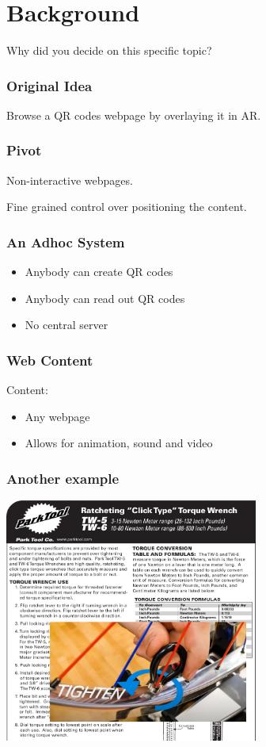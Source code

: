 \documentclass{beamer}
\begin{document}
\section{Background}
\begin{frame}
	\begin{center}
		{\Huge Why did you decide on this specific topic?}
	\end{center}
\end{frame}

\begin{frame}
  \frametitle{Original Idea}

  Browse a QR codes webpage by overlaying it in AR.
\end{frame}

\begin{frame}
  \frametitle{Pivot}

  Non-interactive webpages.

  \medskip

  Fine grained control over positioning the content.
\end{frame}

\begin{frame}
  \frametitle{An Adhoc System}

  \begin{itemize}
    \item Anybody can create QR codes
    \item Anybody can read out QR codes
    \item No central server
  \end{itemize}
\end{frame}

\begin{frame}
  \frametitle{Web Content}

  Content:
  \begin{itemize}
    \item Any webpage
    \item Allows for animation, sound and video
  \end{itemize}
\end{frame}

\begin{frame}
  \frametitle{Another example}

  \includegraphics[height=8cm]{manual_example}
\end{frame}
\end{document}
